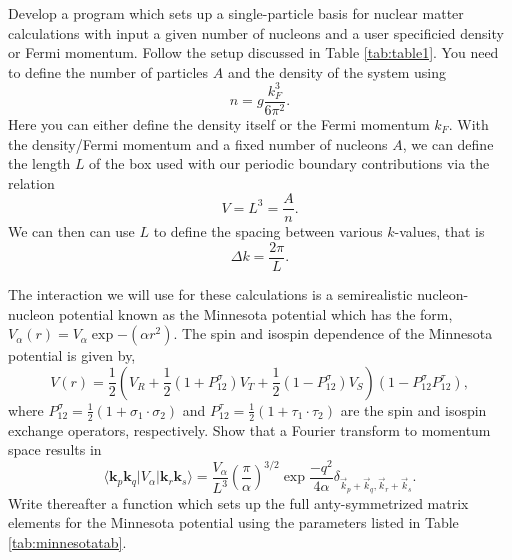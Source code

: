   \begin{prob}\label{problem:spbasissetup}
  Develop a program which sets up a single-particle basis for nuclear
  matter calculations with input a given number of nucleons and a user
  specificied density or Fermi momentum. Follow the setup discussed in
  Table \ref{tab:table1}.  You need to define the number of particles
  $A$ and the density of the system using
  \[
  n = g \frac{k_F^3}{6\pi^2}.
  \]
  Here you can either define the density itself or the Fermi momentum
  $k_F$.  With the density/Fermi momentum and a fixed number of
  nucleons $A$, we can define the length $L$ of the box used with our
  periodic boundary contributions via the relation
  \[
    V= L^3= \frac{A}{n}.
  \]
  We can then can use $L$ to define the spacing between various
  $k$-values, that is
  \[
    \Delta k = \frac{2\pi}{L}.
  \]
  \end{prob}


  \begin{prob}\label{problem:fourier}
  The interaction we will use for these calculations is a
  semirealistic nucleon-nucleon potential known as the Minnesota
  potential \cite{minnesota} which has the form, $V_{\alpha}\left(
  r\right)=V_{\alpha}\exp{-(\alpha r^{2})}$. The spin and isospin
  dependence of the Minnesota potential is given by,
  \[
  V\left( r\right)=\frac{1}{2}\left( V_{R}+\frac{1}{2}\left(
  1+P_{12}^{\sigma}\right) V_{T}+\frac{1}{2}\left(
  1-P_{12}^{\sigma}\right) V_{S}\right)\left(
  1-P_{12}^{\sigma}P_{12}^{\tau}\right),
  \]
  where $P_{12}^{\sigma}=\frac{1}{2}\left(
  1+\sigma_{1}\cdot\sigma_{2}\right)$ and
  $P_{12}^{\tau}=\frac{1}{2}\left( 1+\tau_{1}\cdot\tau_{2}\right)$ are
  the spin and isospin exchange operators, respectively.  Show that a
  Fourier transform to momentum space results in
  \[
  \langle \mathbf{k}_p \mathbf{k}_q \vert V_{\alpha}\vert
  \mathbf{k}_r\mathbf{k}_s\rangle=\frac{V_{\alpha}}{L^{3}}\left(\frac{\pi}{\alpha}\right)^{3/2}\exp{\frac{-q^{2}}{4\alpha}}\delta_{\vec{k}_{p}+\vec{k}_{q},\vec{k}_{r}+\vec{k}_{s}}.
  \]
  Write thereafter a function which sets up the full anty-symmetrized
  matrix elements for the Minnesota potential using the parameters
  listed in Table \ref{tab:minnesotatab}.
  \end{prob}



